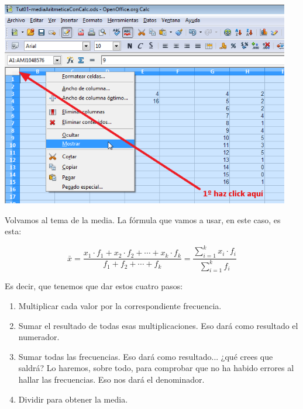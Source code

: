 \documentclass[10pt,a4paper]{article}\usepackage[]{graphicx}\usepackage[]{color}
\begin{document}
    \begin{center}
    \includegraphics[height=9cm]{../fig/Tut01-Calc-Formula-21.png}
    \end{center}
Volvamos al tema de la media. La fórmula que vamos a usar, en este caso, es esta:
       \begin{center}
        \[
        \bar x=\dfrac{x_1\cdot f_1+x_2\cdot f_2+\cdots+x_k\cdot f_k}{f_1+f_2+\cdots+f_k}=
        \dfrac{\displaystyle\sum_{i=1}^k x_i\cdot f_i}{\displaystyle\sum_{i=1}^k f_i}
        \]
        \end{center}
Es decir, que tenemos que dar estos cuatro pasos:
\begin{enumerate}
  \item Multiplicar cada valor por la correspondiente frecuencia.
  \item Sumar el resultado de todas esas multiplicaciones. Eso dará como resultado el numerador.
  \item Sumar todas las frecuencias. Eso dará como resultado... ¿qué crees que saldrá? Lo haremos, sobre todo, para comprobar que no ha habido errores al hallar las frecuencias. Eso nos dará el denominador.
  \item Dividir para obtener la media.
\end{enumerate}
\end{document}
